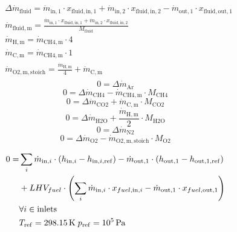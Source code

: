 \begin{equation}
\label{eq:CombustionChamber_stoichiometry_constraints_general_eq}
\begin{split}
&\Delta \dot{m}_\mathrm{fluid} = \dot{m}_\mathrm{in,1} \cdot x_\mathrm{fluid,in,1} +\dot{m}_\mathrm{in,2} \cdot x_\mathrm{fluid,in,2}-\dot{m}_\mathrm{out,1} \cdot x_\mathrm{fluid,out,1}\\
&\dot{m}_\mathrm{fluid,m} = \frac{\dot{m}_\mathrm{in,1} \cdot x_\mathrm{fluid,in,1} +\dot{m}_\mathrm{in,2} \cdot x_\mathrm{fluid,in,2}}{M_\mathrm{fluid}}\\
&\dot{m}_\mathrm{H,m}=\dot{m}_\mathrm{CH4,m} \cdot 4\\
&\dot{m}_\mathrm{C,m}=\dot{m}_\mathrm{CH4,m} \cdot 1\\
&\dot{m}_\mathrm{O2,m,stoich}=\frac{\dot{m}_\mathrm{H,m}}{4} + \dot{m}_\mathrm{C,m}\\
\end{split}
\end{equation}
\begin{equation}
\label{eq:CombustionChamber_stoichiometry_constraints_Ar}
0 = \Delta \dot{m}_\mathrm{Ar}
\end{equation}
\begin{equation}
\label{eq:CombustionChamber_stoichiometry_constraints_CH4}
0=\Delta\dot{m}_\mathrm{CH4}-\dot{m}_\mathrm{CH4,m} \cdot M_\mathrm{CH4}
\end{equation}
\begin{equation}
\label{eq:CombustionChamber_stoichiometry_constraints_CO2}
0=\Delta \dot{m}_\mathrm{CO2} + \dot{m}_\mathrm{C,m} \cdot M_\mathrm{CO2} 
\end{equation}
\begin{equation}
\label{eq:CombustionChamber_stoichiometry_constraints_H2O}
0=\Delta \dot{m}_\mathrm{H2O} + \frac{\dot{m}_\mathrm{H,m}}{2} \cdot M_\mathrm{H2O} 
\end{equation}
\begin{equation}
\label{eq:CombustionChamber_stoichiometry_constraints_N2}
0 = \Delta \dot{m}_\mathrm{N2}
\end{equation}
\begin{equation}
\label{eq:CombustionChamber_stoichiometry_constraints_O2}
0=\Delta\dot{m}_\mathrm{O2}-\dot{m}_\mathrm{O2,m,stoich} \cdot M_\mathrm{O2}
\end{equation}

\begin{equation}
\label{eq:CombustionChamber_energy_balance_constraints}
\begin{split}
0 = & \sum_i \dot{m}_{\mathrm{in,}i} \cdot\left( h_{\mathrm{in,}i} - h_{\mathrm{in,}i\mathrm{,ref}} \right) -\dot{m}_\mathrm{out,1}\cdot\left( h_\mathrm{out,1} - h_\mathrm{out,1,ref}\right)\\
& + LHV_{fuel} \cdot \left(\sum_i \dot{m}_{\mathrm{in,}i} \cdot x_{fuel\mathrm{,in,}i} - \dot{m}_\mathrm{out,1} \cdot x_{fuel\mathrm{,out,1}} \right)\\
& \forall i \in \text{inlets}\\& T_\mathrm{ref}=\unit[298.15]{K}\;p_\mathrm{ref}=\unit[10^5]{Pa}\\
\end{split}
\end{equation}


